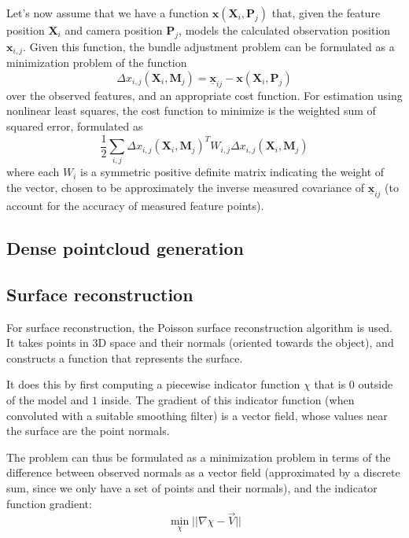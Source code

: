 Let's now assume that we have a function $\bm{x}(\mathbf{X}_i, \mathbf{P}_j)$ that, given the feature position $\mathbf{X}_i$ and camera position $\mathbf{P}_j$, models the calculated observation position $\mathbf{x}_{i, j}$.
Given this function, the bundle adjustment problem can be formulated as a minimization problem of the function \begin{equation} \Delta x_{i, j} (\mathbf{X}_i, \mathbf{M}_j) = \underline{\bm{x}}_{ij} - \bm{x}(\mathbf{X}_i, \mathbf{P}_j) \end{equation}
over the observed features, and an appropriate cost function. For estimation using nonlinear least squares, the cost function to minimize is the weighted sum of squared error, formulated as 
\begin{equation} \frac{1}{2} \sum_{i,j} \Delta x_{i, j} (\mathbf{X}_i, \mathbf{M}_j)^T W_{i,j} \Delta x_{i, j} (\mathbf{X}_i, \mathbf{M}_j) \end{equation}
where each $W_i$ is a symmetric positive definite matrix indicating the weight of the vector, chosen to be approximately the inverse measured covariance of $\underline{\bm{x}}_{ij}$ (to account for the accuracy of measured feature points).

\subsection{Dense pointcloud generation}


\subsection{Surface reconstruction}
For surface reconstruction, the Poisson surface reconstruction \cite{kazhdan2006poisson} algorithm is used.
It takes points in 3D space and their normals (oriented towards the object), and constructs a function that represents the surface.

It does this by first computing a piecewise indicator function $\chi$ that is $0$ outside of the model and $1$ inside. The gradient of this indicator function (when convoluted with a suitable smoothing filter) is a vector field, whose values near the surface are the point normals.

The problem can thus be formulated as a minimization problem in terms of the difference between observed normals as a vector field (approximated by a discrete sum, since we only have a set of points and their normals), and the indicator function gradient:
\begin{equation} \min_\chi || \nabla \chi - \vec{V}|| \end{equation}

